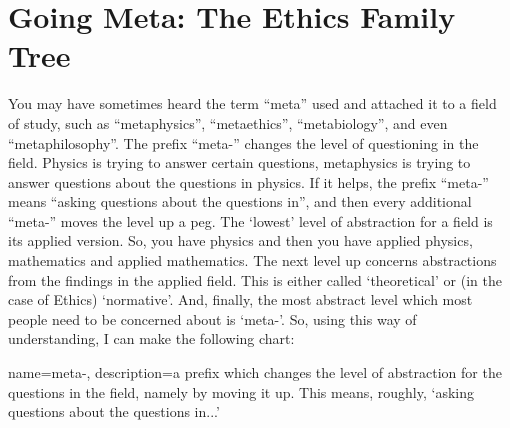 \section{Going Meta: The Ethics Family Tree}  

You may have sometimes heard  the term “meta” used and attached it to a field of study, such as “metaphysics”, “metaethics”, “metabiology”, and even “metaphilosophy”. The prefix “\gls{meta-}” changes the level of questioning in the field. Physics is trying to answer certain questions, metaphysics is trying to answer questions about the questions in physics. If it helps, the prefix “meta-” means “asking questions about the questions in”, and then every additional “meta-” moves the level up a peg. The `lowest' level of abstraction for a field is its applied version. So, you have physics and then you have applied physics, mathematics and applied mathematics. The next level up concerns abstractions from the findings in the applied field. This is either called `theoretical' or (in the case of Ethics) `normative'. And, finally, the most abstract level which most people need to be concerned about is `meta-'. So, using this way of understanding, I can make the following chart: 

\begin{center}
\end{center}

{
  name=meta-,
  description={a prefix which changes the level of abstraction for the questions in the field, namely by moving it up. This means, roughly, `asking questions about the questions in...'}
}


